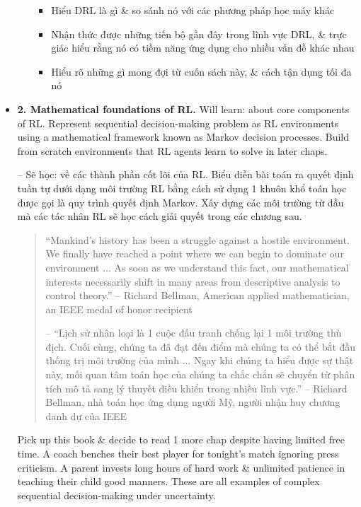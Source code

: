 \documentclass{article}
\begin{document}
\begin{itemize}
\begin{itemize}
        \begin{itemize}
            \item Hiểu DRL là gì \& so sánh nó với các phương pháp học máy khác
            \item Nhận thức được những tiến bộ gần đây trong lĩnh vực DRL, \& trực giác hiểu rằng nó có tiềm năng ứng dụng cho nhiều vấn đề khác nhau
            \item Hiểu rõ những gì mong đợi từ cuốn sách này, \& cách tận dụng tối đa nó
        \end{itemize}
    \end{itemize}
    \item {\bf2. Mathematical foundations of RL.} Will learn: about core components of RL. Represent sequential decision-making problem as RL environments using a mathematical framework known as Markov decision processes. Build from scratch environments that RL agents learn to solve in later chaps.

    -- Sẽ học: về các thành phần cốt lõi của RL. Biểu diễn bài toán ra quyết định tuần tự dưới dạng môi trường RL bằng cách sử dụng 1 khuôn khổ toán học được gọi là quy trình quyết định Markov. Xây dựng các môi trường từ đầu mà các tác nhân RL sẽ học cách giải quyết trong các chương sau.
    \begin{quote}
        ``Mankind's history has been a struggle against a hostile environment. We finally have reached a point where we can begin to dominate our environment $\ldots$ As soon as we understand this fact, our mathematical interests necessarily shift in many areas from descriptive analysis to control theory.'' -- {\sc Richard Bellman}, American applied mathematician, an IEEE medal of honor recipient

        -- ``Lịch sử nhân loại là 1 cuộc đấu tranh chống lại 1 môi trường thù địch. Cuối cùng, chúng ta đã đạt đến điểm mà chúng ta có thể bắt đầu thống trị môi trường của mình $\ldots$ Ngay khi chúng ta hiểu được sự thật này, mối quan tâm toán học của chúng ta chắc chắn sẽ chuyển từ phân tích mô tả sang lý thuyết điều khiển trong nhiều lĩnh vực.'' -- {\sc Richard Bellman}, nhà toán học ứng dụng người Mỹ, người nhận huy chương danh dự của IEEE
    \end{quote}
    Pick up this book \& decide to read 1 more chap despite having limited free time. A coach benches their best player for tonight's match ignoring press criticism. A parent invests long hours of hard work \& unlimited patience in teaching their child good manners. These are all examples of complex sequential decision-making under uncertainty.


\end{itemize}
\end{document}
